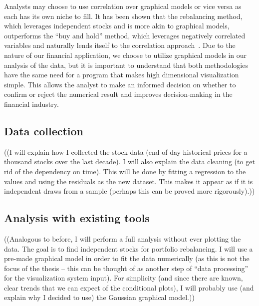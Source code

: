 Analysts may choose to use correlation over graphical models or vice versa as each has its own niche to fill. It has been shown that the rebalancing method, which leverages independent stocks and is more akin to graphical models, outperforms the ``buy and hold'' method, which leverages negatively correlated variables and naturally lends itself to the correlation approach~\cite{liuh2016}. Due to the nature of our financial application, we choose to utilize graphical models in our analysis of the data, but it is important to understand that both methodologies have the same need for a program that makes high dimensional visualization simple. This allows the analyst to make an informed decision on whether to confirm or reject the numerical result and improves decision-making in the financial industry.




\subsection{Data collection}
\label{sec:intro:numerical:datacollection}

((I will explain how I collected the stock data (end-of-day historical prices for a thousand stocks over the last decade). I will also explain the data cleaning (to get rid of the dependency on time). This will be done by fitting a regression to the values and using the residuals as the new dataset. This makes it appear as if it is independent draws from a sample (perhaps this can be proved more rigorously).))




\subsection{Analysis with existing tools}
\label{sec:intro:numerical:analysis}

((Analogous to before, I will perform a full analysis without ever plotting the data. The goal is to find independent stocks for portfolio rebalancing. I will use a pre-made graphical model in order to fit the data numerically (as this is not the focus of the thesis – this can be thought of as another step of “data processing” for the visualization system input). For simplicity (and since there are known, clear trends that we can expect of the conditional plots), I will probably use (and explain why I decided to use) the Gaussian graphical model.))